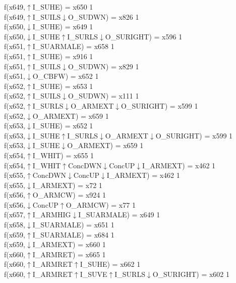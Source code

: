 f(x649,$\uparrow$I\_SUHE) = x650 {1} \\
f(x649,$\uparrow$I\_SUILS$\downarrow$O\_SUDWN) = x826 {1} \\
f(x650,$\downarrow$I\_SUHE) = x649 {1} \\
f(x650,$\downarrow$I\_SUHE$\uparrow$I\_SURLS$\downarrow$O\_SURIGHT) = x596 {1} \\
f(x651,$\uparrow$I\_SUARMALE) = x658 {1} \\
f(x651,$\uparrow$I\_SUHE) = x916 {1} \\
f(x651,$\uparrow$I\_SUILS$\downarrow$O\_SUDWN) = x829 {1} \\
f(x651,$\downarrow$O\_CBFW) = x652 {1} \\
f(x652,$\uparrow$I\_SUHE) = x653 {1} \\
f(x652,$\uparrow$I\_SUILS$\downarrow$O\_SUDWN) = x111 {1} \\
f(x652,$\uparrow$I\_SURLS$\downarrow$O\_ARMEXT$\downarrow$O\_SURIGHT) = x599 {1} \\
f(x652,$\downarrow$O\_ARMEXT) = x659 {1} \\
f(x653,$\downarrow$I\_SUHE) = x652 {1} \\
f(x653,$\downarrow$I\_SUHE$\uparrow$I\_SURLS$\downarrow$O\_ARMEXT$\downarrow$O\_SURIGHT) = x599 {1} \\
f(x653,$\downarrow$I\_SUHE$\downarrow$O\_ARMEXT) = x659 {1} \\
f(x654,$\uparrow$I\_WHIT) = x655 {1} \\
f(x654,$\uparrow$I\_WHIT$\uparrow$ConcDWN$\downarrow$ConcUP$\downarrow$I\_ARMEXT) = x462 {1} \\
f(x655,$\uparrow$ConcDWN$\downarrow$ConcUP$\downarrow$I\_ARMEXT) = x462 {1} \\
f(x655,$\downarrow$I\_ARMEXT) = x72 {1} \\
f(x656,$\uparrow$O\_ARMCW) = x924 {1} \\
f(x656,$\downarrow$ConcUP$\uparrow$O\_ARMCW) = x77 {1} \\
f(x657,$\uparrow$I\_ARMHIG$\downarrow$I\_SUARMALE) = x649 {1} \\
f(x658,$\downarrow$I\_SUARMALE) = x651 {1} \\
f(x659,$\uparrow$I\_SUARMALE) = x684 {1} \\
f(x659,$\downarrow$I\_ARMEXT) = x660 {1} \\
f(x660,$\uparrow$I\_ARMRET) = x665 {1} \\
f(x660,$\uparrow$I\_ARMRET$\uparrow$I\_SUHE) = x662 {1} \\
f(x660,$\uparrow$I\_ARMRET$\uparrow$I\_SUVE$\uparrow$I\_SURLS$\downarrow$O\_SURIGHT) = x602 {1} \\

